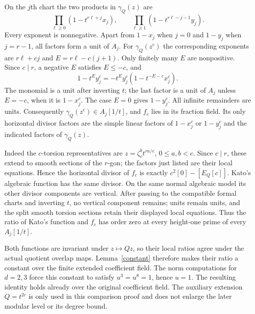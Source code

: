 \documentclass[11pt]{article}
\theoremstyle{remark}\newtheorem{remark}[theorem]{Remark}
\begin{document}
On the $j$th chart the two products in $\gamma_Q(z)$ are
\[
 \prod_{\ell\geq0}(1-t^{r\ell+j}x_j),\qquad
 \prod_{\ell\geq1}(1-t^{r\ell-j-1}y_j).
\]
Every exponent is nonnegative. Apart from $1-x_j$ when $j=0$ and
$1-y_j$ when $j=r-1$, all factors form a unit of $A_j$.
For $\gamma_Q(z^c)$ the corresponding exponents are
$r\ell+cj$ and $E=r\ell-c(j+1)$. Only finitely many $E$ are nonpositive.
Since $c\mid r$, a negative $E$ satisfies $E\leq-c$, and
\[
 1-t^Ey_j^c=-t^Ey_j^c(1-t^{-E-c}x_j^c).
\]
The monomial is a unit after inverting $t$; the last factor is a unit
of $A_j$ unless $E=-c$, when it is $1-x_j^c$.
The case $E=0$ gives $1-y_j^c$. All infinite remainders are units.
Consequently $\gamma_Q(z^c)\in A_j[1/t]$, and $f_c$ lies in its
fraction field. Its only horizontal divisor factors are the simple
linear factors of $1-x_j^c$ or $1-y_j^c$ and the indicated factors
of $\gamma_Q(z)$.

Indeed the $c$-torsion representatives are
$z=\zeta_c^b t^{ra/c}$, $0\leq a,b<c$. Since $c\mid r$, these extend
to smooth sections of the $r$-gon; the factors just listed are their
local equations. Hence the horizontal divisor of $f_c$ is exactly
$c^2[0]-[E_Q[c]]$. Kato's algebraic function has the same divisor.
On the same normal algebraic model its other divisor components are
vertical. After passing to the compatible formal charts and inverting
$t$, no vertical component remains; units remain units, and the split
smooth torsion sections retain their displayed local equations.
Thus the ratio of Kato's function and $f_c$ has order zero at every
height-one prime of every $A_j[1/t]$.

Both functions are invariant under $z\mapsto Qz$, so their local
ratios agree under the actual quotient overlap maps. Lemma~\ref{constant}
therefore makes their ratio a constant over the finite extended
coefficient field. The norm computations for $d=2,3$ force this
constant to satisfy $u^3=u^8=1$, hence $u=1$. The resulting identity
holds already over the original coefficient field. The auxiliary
extension $Q=t^{2c}$ is only used in this comparison proof and does
not enlarge the later modular level or its degree bound.
\end{document}
